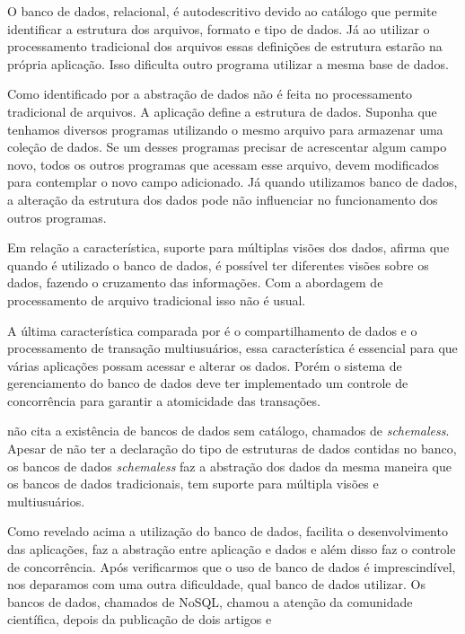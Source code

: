 O banco de dados, relacional, é autodescritivo devido ao catálogo que permite identificar a estrutura dos arquivos, formato e tipo de dados. Já  ao utilizar o processamento tradicional dos arquivos essas definições de estrutura estarão na própria aplicação. Isso dificulta outro programa utilizar a mesma base de dados.

Como identificado por  a abstração de dados não é feita no processamento tradicional de arquivos. A aplicação define a estrutura de dados. Suponha que tenhamos diversos programas utilizando o mesmo arquivo para armazenar uma coleção de dados. Se um desses programas precisar de acrescentar algum campo novo, todos os outros programas que acessam esse arquivo, devem modificados para contemplar o novo campo adicionado. Já quando utilizamos banco de dados, a alteração da estrutura dos dados pode não influenciar no funcionamento dos outros programas.

Em relação a característica, suporte para múltiplas visões dos dados,  afirma que quando é utilizado o banco de dados, é possível ter diferentes visões sobre os dados, fazendo o cruzamento das informações. Com a abordagem de processamento de arquivo tradicional isso não é usual.

A última característica comparada por  é o compartilhamento de dados e o processamento de transação multiusuários, essa característica é essencial para que várias aplicações possam acessar e alterar os dados. Porém o sistema de gerenciamento do banco de dados deve ter implementado um controle de concorrência para garantir a atomicidade das transações.

 não cita a existência de bancos de dados sem catálogo, chamados de \textit{schemaless}. Apesar de não ter a declaração do tipo de estruturas de dados contidas no banco, os bancos de dados \textit{schemaless} faz a abstração dos dados da mesma maneira que os bancos de dados tradicionais, tem suporte para múltipla visões e multiusuários.

Como revelado acima a utilização do banco de dados, facilita o desenvolvimento das aplicações, faz a abstração entre aplicação e dados e além disso faz o controle de concorrência. Após verificarmos que o uso de banco de dados é imprescindível, nos deparamos com uma outra dificuldade, qual banco de dados utilizar. Os bancos de dados, chamados de NoSQL, chamou a atenção da comunidade científica, depois da publicação de dois artigos  e 


